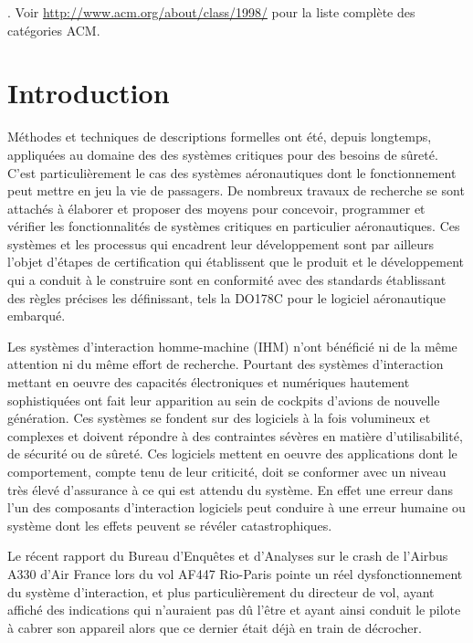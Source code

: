 \documentclass{ihm}
\begin{document}

.
Voir \url{http://www.acm.org/about/class/1998/} pour la liste complète des catégories ACM.

\section{Introduction}

Méthodes  et  techniques de  descriptions  formelles  ont été,  depuis
longtemps, appliquées au  domaine des des systèmes  critiques pour des
besoins  de  sûreté.  C'est   particulièrement  le  cas  des  systèmes
aéronautiques  dont le  fonctionnement peut  mettre en  jeu la  vie de
passagers.   De  nombreux travaux  de  recherche  se sont  attachés  à
élaborer et proposer des moyens pour concevoir, programmer et vérifier
les   fonctionnalités    de   systèmes   critiques    en   particulier
aéronautiques.   Ces  systèmes et  les  processus  qui encadrent  leur
développement sont par ailleurs  l'objet d'étapes de certification qui
établissent que  le produit  et le  développement qui  a conduit  à le
construire  sont  en conformité  avec  des  standards établissant  des
règles précises les définissant, tels  la DO178C \cite{DO178C} pour le
logiciel aéronautique embarqué.

Les systèmes  d'interaction homme-machine (IHM) n'ont  bénéficié ni de
la  même attention  ni  du  même effort  de  recherche.  Pourtant  des
systèmes d'interaction  mettant en oeuvre des  capacités électroniques
et numériques hautement sophistiquées ont fait leur apparition au sein
de cockpits d'avions de nouvelle  génération.  Ces systèmes se fondent
sur  des  logiciels à  la  fois  volumineux  et complexes  et  doivent
répondre  à des  contraintes  sévères en  matière d'utilisabilité,  de
sécurité  ou  de   sûreté.   Ces  logiciels  mettent   en  oeuvre  des
applications dont le comportement, compte tenu de leur criticité, doit
se  conformer avec  un  niveau très  élevé d'assurance  à  ce qui  est
attendu  du système.  En effet  une  erreur dans  l'un des  composants
d'interaction logiciels peut conduire à  une erreur humaine ou système
dont les effets peuvent se révéler catastrophiques.

Le récent rapport du Bureau  d'Enquêtes et d'Analyses \cite{BEA12} sur
le crash  de l'Airbus A330  d'Air France  lors du vol  AF447 Rio-Paris
pointe  un réel  dysfonctionnement du  système d'interaction,  et plus
particulièrement du  directeur de  vol, ayant affiché  des indications
qui n'auraient pas dû l'être et ayant ainsi conduit le pilote à cabrer
son appareil alors que ce dernier était déjà en train de décrocher.
\end{document}
